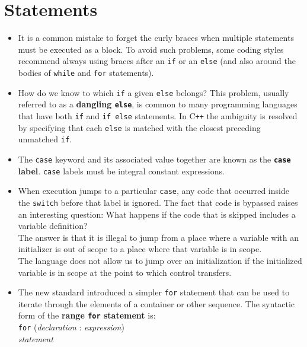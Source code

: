 \section{Statements}
\begin{itemize}

\item
It is a common mistake to forget the curly braces when multiple statements must be executed as a block. To avoid such problems, some coding styles recommend always using braces after an \texttt{if} or an \texttt{else} (and also around the bodies of \texttt{while} and \texttt{for} statements).

\item
How do we know to which \texttt{if} a given \texttt{else} belongs? This problem, usually referred to as a \textbf{dangling \texttt{else}}, is common to many programming languages that have both \texttt{if} and \texttt{if else} statements. In C\texttt{++} the ambiguity is resolved by specifying that each \texttt{else} is matched with the closest preceding unmatched \texttt{if}.

\item
The \texttt{case} keyword and its associated value together are known as the \textbf{\texttt{case} label}. \texttt{case} labels must be integral constant expressions.

\item
When execution jumps to a particular \texttt{case}, any code that occurred inside the \texttt{switch} before that label is ignored. The fact that code is bypassed raises an interesting question: What happens if the code that is skipped includes a variable definition?\\
The answer is that it is illegal to jump from a place where a variable with an initializer is out of scope to a place where that variable is in scope.\\
The language does not allow us to jump over an initialization if the initialized variable is in scope at the point to which control transfers.

\item
The new standard introduced a simpler \texttt{for} statement that can be used to iterate through the elements of a container or other sequence. The syntactic form of the \textbf{range \texttt{for} statement} is:\\
\hspace*{1em}\texttt{for} (\textit{declaration} : \textit{expression})\\
\hspace*{3em}\textit{statement}


\end{itemize}
